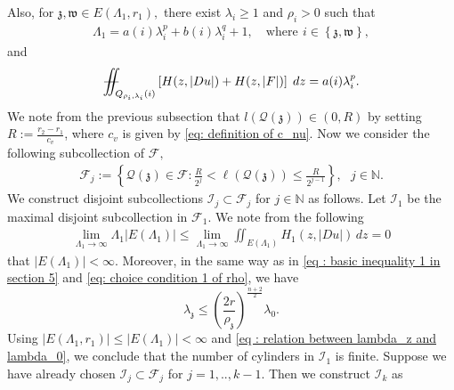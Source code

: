 \documentclass[11pt,oneside, english,reqno,twoside a4paper]{amsart}
\theoremstyle{definition}
\numberwithin{theorem}{section}
\numberwithin{equation}{section}
\newcommand{\La}{\Lambda}
\newcommand{\NN}{\mathbb{N}}
\newcommand{\iintss}{{\int\hspace{-0.28cm}\int}}
\newcommand{ \miints }{{\iintss\hspace{-0.56cm} -\hspace{-0.15cm}-}}
\newcommand{\miint}[1]{{\miints_{\hspace{-0.13cm}#1}}}
\begin{document}
Also, for $\mathfrak{z}, \mathfrak{w}\in E(\Lambda_1, r_1),$ there exist $\lambda_i\geq1$ and $\rho_i>0$ such that
\begin{align*}
    \Lambda_1=a(i)\lambda^p_{i}+b(i)\lambda^q_{i}+1, \quad \text{where} \ \, i\in \left\{\mathfrak{z}, \mathfrak{w}\right\},
\end{align*}
and 
\begin{equation}\label{eq : mean integral of H equals to lambda_p}
    \miint{Q_{\rho_{i},\lambda_i}(i)}\left[H(z,|Du|)+H(z,|F|)\right]\; dz=a(i)\lambda_i^p.
\end{equation}
We note from the previous subsection that $l(\mathcal{Q}(\mathfrak{z}))\in (0, R)$ by setting $R:=\frac{r_2-r_1}{c_v}$, where $c_v$ is given by \eqref{eq: definition of c_nu}. Now we consider the following subcollection of $\mathcal{F},$
\begin{align*}
  \mathcal{F}_j:=\left\{\mathcal{Q}(\mathfrak{z})\in \mathcal{F} : \frac{R}{2^j}< \ell({\mathcal{Q}(\mathfrak{z})})\leq \frac{R}{2^{j-1}}\right\}, \,\,\,\, j\in \mathbb{N}.
\end{align*}
We construct disjoint subcollections $\mathcal{I}_j \subset \mathcal{F}_j$ for $j \in \NN$ as follows. Let $\mathcal{I}_1$ be the maximal disjoint  subcollection in $\mathcal{F}_1.$ We note from the following
\begin{align*}
    \lim_{\La_1\to \infty}\La_1|E(\Lambda_1)|\leq \lim_{\La_1 \to \infty}\iint_{E(\Lambda_1)}H_1(z, |D u|)\, dz=0
\end{align*}
that $|E(\Lambda_1)|<\infty.$ 
Moreover, in the same way as in \eqref{eq : basic inequality 1 in section 5} and \eqref{eq: choice condition 1 of rho}, we have 
\begin{equation}    \label{eq : relation between lambda_z and lambda_0}
    \lambda_\mathfrak{z}\leq \left(\frac{2r}{\rho_\mathfrak{z}}\right)^{\frac{n+2}{2}}\lambda_0.
\end{equation}
Using $|E(\La_1, r_1)|\leq |E(\La_1)|< \infty$ and \eqref{eq : relation between lambda_z and lambda_0}, we conclude that the number of cylinders in $\mathcal{I}_1$ is finite. Suppose we have already chosen $\mathcal{I}_j \subset \mathcal{F}_j$ for $j=1,..,k-1.$ Then we construct $\mathcal{I}_k$ as
\end{document}
